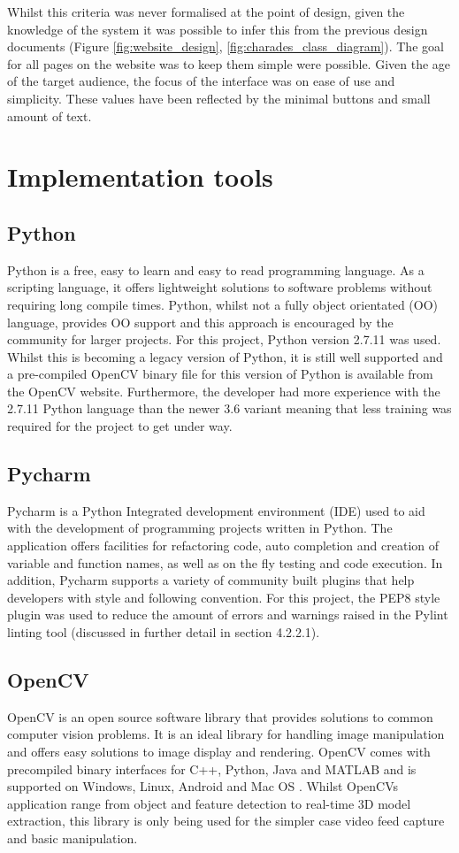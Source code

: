 Whilst this criteria was never formalised at the point of design, given the knowledge of the system it was possible to infer this from the previous design documents (Figure \ref{fig:website_design}, \ref{fig:charades_class_diagram}). The goal for all pages on the website was to keep them simple were possible. Given the age of the target audience, the focus of the interface was on ease of use and simplicity. These values have been reflected by the minimal buttons and small amount of text.

\section{Implementation tools}
\subsection{Python}
Python is a free, easy to learn and easy to read programming language. As a scripting language, it offers lightweight solutions to software problems without requiring long compile times. Python, whilst not a fully object orientated (OO) language, provides OO support and this approach is encouraged by the community for larger projects. For this project, Python version 2.7.11 was used. Whilst this is becoming a legacy version of Python, it is still well supported and a pre-compiled OpenCV binary file for this version of Python is available from the OpenCV website. Furthermore, the developer had more experience with the 2.7.11 Python language than the newer 3.6 variant meaning that less training was required for the project to get under way.

\subsection{Pycharm}
Pycharm is a Python Integrated development environment (IDE) used to aid with the development of programming projects written in Python. The application offers facilities for refactoring code, auto completion and creation of variable and function names, as well as on the fly testing and code execution. In addition, Pycharm supports a variety of community built plugins that help developers with style and following convention. For this project, the PEP8 style plugin was used to reduce the amount of errors and warnings raised in the Pylint linting tool (discussed in further detail in section 4.2.2.1).

\subsection{OpenCV}
OpenCV is an open source software library that provides solutions to common computer vision problems. It is an ideal library for handling image manipulation and offers easy solutions to image display and rendering. OpenCV comes with precompiled binary interfaces for C++, Python, Java and MATLAB and is supported on Windows, Linux, Android and Mac OS \cite{open_cv_binaries}. Whilst OpenCVs application range from object and feature detection to real-time 3D model extraction, this library is only being used for the simpler case video feed capture and basic manipulation.

